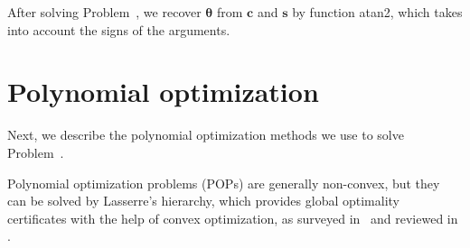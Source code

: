 After solving Problem~, we recover $\bm{\theta}$ from $\bm{c}$ and $\bm{s}$ by function atan2, which takes into account the signs of the arguments.

\section{Polynomial optimization}
Next, we describe the polynomial optimization methods we use to solve Problem~.

Polynomial optimization problems (POPs) are generally non-convex, but they can be solved by Lasserre's hierarchy, which provides global optimality certificates with the help of convex optimization, as surveyed in~\cite{Lasserre2015} and reviewed in .


